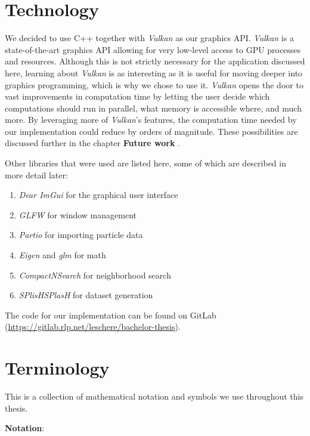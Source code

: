 \section{Technology}

We decided to use C++ together with \textit{Vulkan} as our graphics API. \textit{Vulkan} is a state-of-the-art graphics API allowing for very low-level access to GPU processes and resources. Although this is not strictly necessary for the application discussed here, learning about \textit{Vulkan} is as interesting as it is useful for moving deeper into graphics programming, which is why we chose to use it. \textit{Vulkan} opens the door to vast improvements in computation time by letting the user decide which computations should run in parallel, what memory is accessible where, and much more. By leveraging more of \textit{Vulkan}'s features, the computation time needed by our implementation could reduce by orders of magnitude. These possibilities are discussed further in the chapter \textbf{Future work }.

Other libraries that were used are listed here, some of which are described in more detail later:
\begin{enumerate}
    \item \textit{Dear ImGui} for the graphical user interface \cite{ImGui}
    \item \textit{GLFW} for window management
    \item \textit{Partio} for importing particle data \cite{Partio}
    \item \textit{Eigen} and \textit{glm} for math \cite{Eigen}
    \item \textit{CompactNSearch} for neighborhood search \cite{CompactNSearch}
    \item \textit{SPlisHSPlasH} for dataset generation \cite{SplishSplash}
\end{enumerate}

The code for our implementation can be found on GitLab (\url{https://gitlab.rlp.net/leschere/bachelor-thesis}).

\section{Terminology}

This is a collection of mathematical notation and symbols we use throughout this thesis.

\textbf{Notation}:

